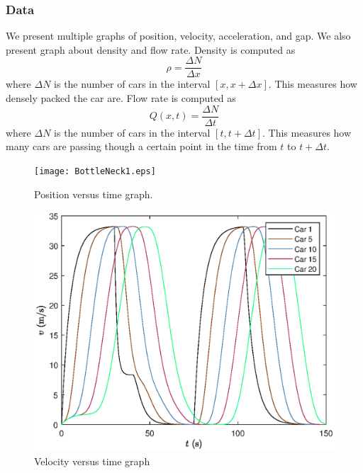 \documentclass[12pt]{article}
\begin{document}
    \subsubsection{Data}
    We present multiple graphs of position, velocity, acceleration, and gap. We also present graph about density and flow rate. Density is computed as 
    \begin{equation} 
      \rho = \frac{\Delta N}{\Delta x}
    \end{equation}
    where $\Delta N$ is the number of cars in the interval $[x, x+\Delta x]$. This measures how densely packed the car are. Flow rate is computed as 
    \begin{equation} 
      Q(x,t) = \frac{\Delta N}{\Delta t}
    \end{equation}
    where $\Delta N$ is the number of cars in the interval $[t, t +\Delta t]$. This measures how many cars are passing though a certain point in the time from $t$ to $t + \Delta t$. 
    \begin{figure}[H]\label{fig:homogeneousPos}
      \texttt{[image: BottleNeck1.eps]}
      \centering
      \caption{Position versus time graph.}
  \end{figure}

  \begin{figure}[H]\label{fig:homogeneousVel}
    \includegraphics[width=13cm]{BottleNeck2.eps}
    \centering
    \caption{Velocity versus time graph}
  \end{figure}
\end{document}
